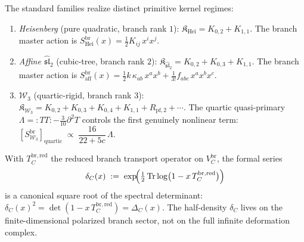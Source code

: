 \begin{computation}
\label{comp:vol2-archetype-master-actions}

The standard families realize distinct primitive kernel regimes:
\begin{enumerate}[label=\textup{(\alph*)}]
\item \emph{Heisenberg} \textup{(}pure quadratic, branch rank $1$\textup{):}
$\mathfrak{K}_{\mathrm{Hei}} = K_{0,2} + K_{1,1}$.
The branch master action is
$S^{\mathrm{br}}_{\mathrm{Hei}}(x) = \tfrac{1}{2}K_{ij}\,x^i x^j$.
\item \emph{Affine $\widehat{\mathfrak{sl}}_2$}
\textup{(}cubic-tree, branch rank $2$\textup{):}
$\mathfrak{K}_{\widehat{\mathfrak{sl}}_2} = K_{0,2} + K_{0,3} + K_{1,1}$.
The branch master action is
$S^{\mathrm{br}}_{\mathrm{aff}}(x) =
\tfrac{1}{2}k\,\kappa_{ab}\,x^a x^b
+ \tfrac{1}{3!}f_{abc}\,x^a x^b x^c$.
\item \emph{$\mathcal{W}_3$}
\textup{(}quartic-rigid, branch rank $3$\textup{):}
$\mathfrak{K}_{\mathcal{W}_3} = K_{0,2} + K_{0,3} + K_{0,4}
+ K_{1,1} + R_{\mathrm{pf},2} + \cdots$.
The quartic quasi-primary
$\Lambda = {:}TT{:} - \tfrac{3}{10}\partial^2 T$ controls the first
genuinely nonlinear term:
$[S^{\mathrm{br}}_{\mathcal{W}_3}]_{\mathrm{quartic}}
\;\propto\;
\dfrac{16}{22 + 5c}\,\Lambda$.
\end{enumerate}
\end{computation}

\begin{corollary}
\label{cor:vol2-metaplectic-square-root}

With $T_C^{\mathrm{br,red}}$ the reduced branch transport operator
on $V_C^{\mathrm{br}}$, the formal series
\begin{equation}
\label{eq:vol2-metaplectic}
\delta_C(x)
\;:=\;
\exp\!\Bigl(\tfrac{1}{2}
\operatorname{Tr}\log\bigl(1 - x\,T_C^{\mathrm{br,red}}\bigr)
\Bigr)
\end{equation}
is a canonical square root of the spectral determinant:
$\delta_C(x)^2 = \det(1 - x\,T_C^{\mathrm{br,red}}) = \Delta_C(x)$.
The half-density $\delta_C$ lives on the finite-dimensional polarized
branch sector, not on the full infinite deformation complex.
\end{corollary}

